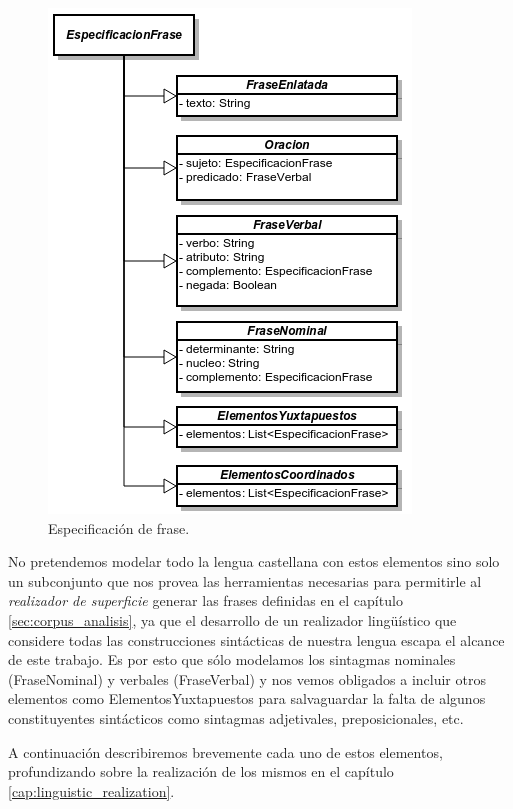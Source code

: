 \begin{figure}[h]
  	\centering
	\includegraphics[scale=0.7]{img/phrase_spec.png}
	\caption{Especificación de frase.}
  	\label{fig:phase_spec}
\end{figure}

No pretendemos modelar todo la lengua castellana con estos elementos sino solo un subconjunto que nos provea las herramientas necesarias para permitirle al \emph{realizador de superficie} generar las frases definidas en el capítulo \ref{sec:corpus_analisis}, ya que el desarrollo de un realizador lingüístico que considere todas las construcciones sintácticas de nuestra lengua escapa el alcance de este trabajo. Es por esto que sólo modelamos los sintagmas nominales (FraseNominal) y verbales (FraseVerbal) y nos vemos obligados a incluir otros elementos como ElementosYuxtapuestos para salvaguardar la falta de algunos constituyentes sintácticos como sintagmas adjetivales, preposicionales, etc. 

A continuación describiremos brevemente cada uno de estos elementos, profundizando sobre la realización de los mismos en el capítulo \ref{cap:linguistic_realization}.


